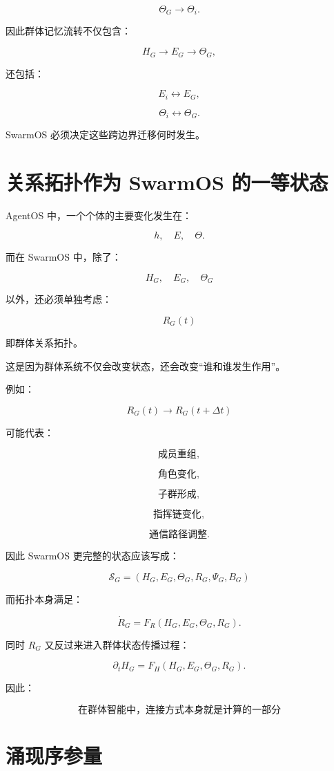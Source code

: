 \[
\Theta_G
\rightarrow
\Theta_i.
\]

因此群体记忆流转不仅包含：

\[
H_G
\rightarrow
E_G
\rightarrow
\Theta_G,
\]

还包括：

\[
E_i
\leftrightarrow
E_G,
\]

\[
\Theta_i
\leftrightarrow
\Theta_G.
\]

SwarmOS 必须决定这些跨边界迁移何时发生。


\section{关系拓扑作为 SwarmOS 的一等状态}

AgentOS 中，一个个体的主要变化发生在：

\[
h,
\quad
E,
\quad
\Theta.
\]

而在 SwarmOS 中，除了：

\[
H_G,
\quad
E_G,
\quad
\Theta_G
\]

以外，还必须单独考虑：

\[
\boxed{
R_G(t)
}
\]

即群体关系拓扑。

这是因为群体系统不仅会改变状态，还会改变``谁和谁发生作用''。

例如：

\[
R_G(t)
\rightarrow
R_G(t+\Delta t)
\]

可能代表：

\[
\text{成员重组},
\]

\[
\text{角色变化},
\]

\[
\text{子群形成},
\]

\[
\text{指挥链变化},
\]

\[
\text{通信路径调整}.
\]

因此 SwarmOS 更完整的状态应该写成：

\[
\boxed{
\mathcal{S}_G
=
\left(
H_G,
E_G,
\Theta_G,
R_G,
\Psi_G,
B_G
\right)
}
\]

而拓扑本身满足：

\[
\dot R_G
=
F_R
\left(
H_G,
E_G,
\Theta_G,
R_G
\right).
\]

同时 $R_G$ 又反过来进入群体状态传播过程：

\[
\partial_tH_G
=
F_H
\left(
H_G,
E_G,
\Theta_G,
R_G
\right).
\]

因此：

\[
\boxed{
\text{在群体智能中，连接方式本身就是计算的一部分}
}
\]


\section{涌现序参量}

